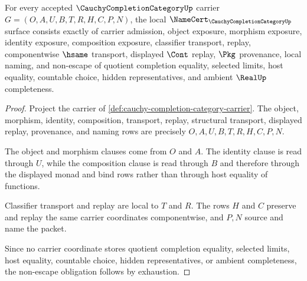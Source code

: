 \begin{theorem}
\label{thm:cauchy-completion-category-namecert-obligations}
For every accepted $\CauchyCompletionCategoryUp$ carrier $G=(O,A,U,B,T,R,H,C,P,N)$, the local $\NameCert_{\CauchyCompletionCategoryUp}$ surface consists exactly of carrier admission, object exposure, morphism exposure, identity exposure, composition exposure, classifier transport, replay, componentwise $\hsame$ transport, displayed $\Cont$ replay, $\Pkg$ provenance, local naming, and non-escape of quotient completion equality, selected limits, host equality, countable choice, hidden representatives, and ambient $\RealUp$ completeness.
\end{theorem}
\begin{proof}
Project the carrier of \autoref{def:cauchy-completion-category-carrier}. The object, morphism, identity, composition, transport, replay, structural transport, displayed replay, provenance, and naming rows are precisely $O,A,U,B,T,R,H,C,P,N$.

The object and morphism clauses come from $O$ and $A$. The identity clause is read through $U$, while the composition clause is read through $B$ and therefore through the displayed monad and bind rows rather than through host equality of functions.

Classifier transport and replay are local to $T$ and $R$. The rows $H$ and $C$ preserve and replay the same carrier coordinates componentwise, and $P,N$ source and name the packet.

Since no carrier coordinate stores quotient completion equality, selected limits, host equality, countable choice, hidden representatives, or ambient completeness, the non-escape obligation follows by exhaustion.
\end{proof}

